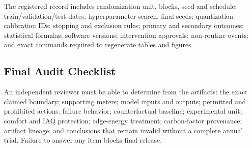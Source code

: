 The registered record includes randomization unit, blocks, seed and schedule; train/validation/test dates; hyperparameter search; final seeds; quantization calibration IDs; stopping and exclusion rules; primary and secondary outcomes; statistical formulas; software versions; intervention approvals; non-routine events; and exact commands required to regenerate tables and figures.

\subsection{Final Audit Checklist}

An independent reviewer must be able to determine from the artifacts: the exact claimed boundary; supporting meters; model inputs and outputs; permitted and prohibited actions; failure behavior; counterfactual baseline; experimental unit; comfort and IAQ protection; edge-energy treatment; carbon-factor provenance; artifact lineage; and conclusions that remain invalid without a complete annual trial. Failure to answer any item blocks final release.
